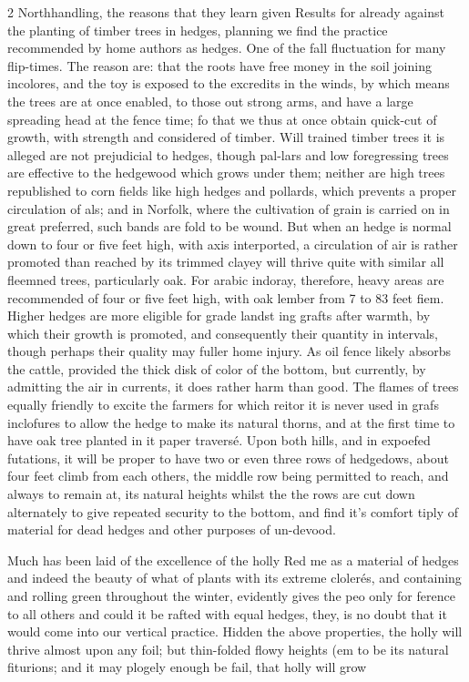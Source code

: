 \documentclass[10pt]{article}
\begin{document}
\begin{multicols}{2}
Northhandling, the reasons that they learn given Results for already against the planting of timber trees in hedges, planning we find the practice recommended by home authors as hedges. One of the fall fluctuation for many flip-times. The reason are: that the roots have free money in the soil joining incolores, and the toy is exposed to the excredits in the winds, by which means the trees are at once enabled, to those out strong arms, and have a large spreading head at the fence time; fo that we thus at once obtain quick-cut of growth, with strength and considered of timber. Will trained timber trees it is alleged are not prejudicial to hedges, though pal-lars and low foregressing trees are effective to the hedgewood which grows under them; neither are high trees republished to corn fields like high hedges and pollards, which prevents a proper circulation of als; and in Norfolk, where the cultivation of grain is carried on in great preferred, such bands are fold to be wound. But when an hedge is normal down to four or five feet high, with axis interported, a circulation of air is rather promoted than reached by its trimmed clayey will thrive quite with similar all fleemned trees, particularly oak. For arabic indoray, therefore, heavy areas are recommended of four or five feet high, with oak lember from 7 to 83 feet fiem. Higher hedges are more eligible for grade landst ing grafts after warmth, by which their growth is promoted, and consequently their quantity in intervals, though perhaps their quality may fuller home injury. As oil fence likely absorbs the cattle, provided the thick disk of color of the bottom, but currently, by admitting the air in currents, it does rather harm than good. The flames of trees equally friendly to excite the farmers for which reitor it is never used in grafs inclofures to allow the hedge to make its natural thorns, and at the first time to have oak tree planted in it paper traversé. Upon both hills, and in expoefed futations, it will be proper to have two or even three rows of hedgedows, about four feet climb from each others, the middle row being permitted to reach, and always to remain at, its natural heights whilst the the rows are cut down alternately to give repeated security to the bottom, and find it's comfort tiply of material for dead hedges and other purposes of un-devood.

Much has been laid of the excellence of the holly Red me as a material of hedges and indeed the beauty of what of plants with its extreme clolerés, and containing and rolling green throughout the winter, evidently gives the peo only for ference to all others and could it be rafted with equal hedges, they, is no doubt that it would come into our vertical practice. Hidden the above properties, the holly will thrive almost upon any foil; but thin-folded flowy heights (em to be its natural fiturions; and it may plogely enough be fail, that holly will grow

\end{multicols}
\end{document}
